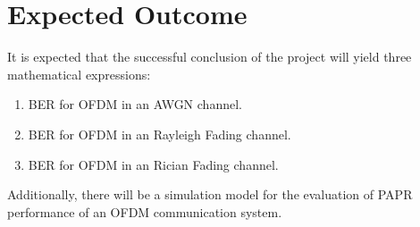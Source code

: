 \section*{Expected Outcome}
It is expected that the successful conclusion of the project will yield three mathematical expressions:
\begin{enumerate}
	\item \gls{BER} for \gls{OFDM} in an \gls{AWGN} channel.
	\item \gls{BER} for \gls{OFDM} in an Rayleigh Fading channel.
	\item \gls{BER} for \gls{OFDM} in an Rician Fading channel.
\end{enumerate}

Additionally, there will be a simulation model for the evaluation of \gls{PAPR} performance of an \gls{OFDM} communication system.